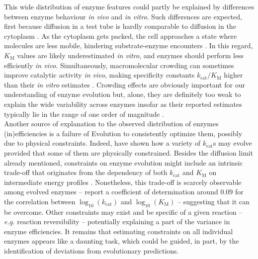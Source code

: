 \documentclass[11pt,onecolumn]{article}
\begin{document}
This wide distribution of enzyme features could partly be explained by differences between enzyme behaviour \textit{in vivo} and \textit{in vitro}. Such differences are expected, first because diffusion in a test tube is hardly comparable to diffusion in the cytoplasm \citep{Ellis01,Rivas04,Zhou08,Rivas18}. As the cytoplasm gets packed, the cell approaches a state where molecules are less mobile, hindering substrate-enzyme encounters \citep{Muramatsu88,Zimmerman93,Blanco18}. In this regard, $K_\text{M}$ values are likely underestimated \textit{in vitro}, and enzymes should perform less efficiently \textit{in vivo}. Simultaneously, macromolecular crowding can sometimes improve catalytic activity \textit{in vivo}, making specificity constants $k_\text{cat}/K_\text{M}$ higher than their \textit{in vitro} estimates \citep{Ralston90,Ellis01,Jiang07,Pozdnyakova10}. Crowding effects are obviously important for our understanding of enzyme evolution but, alone, they are definitely too weak to explain the wide variability across enzymes insofar as their reported estimates typically lie in the range of one order of magnitude \citep{Davidi16}. \\

Another source of explanation to the observed distribution of enzymes (in)efficiencies is a failure of Evolution to consistently optimize them, possibly due to physical constraints. Indeed, \citet{Heckmann18} have shown how a variety of $k_\text{cat}$s may evolve provided that some of them are physically constrained. Besides the diffusion limit already mentioned, constraints on enzyme evolution might include an intrinsic trade-off \citep{Gudelj10,Stiffler15} that originates from the dependency of both $k_\text{cat}$ and $K_\text{M}$ on intermediate energy profiles \citep{Heinrich91}. Nonetheless, this trade-off is scarcely observable among evolved enzymes -- \citet{Bar-Even11} report a coefficient of determination around $0.09$ for the correlation between $\log_{10}(k_\text{cat})$ and $\log_{10}(K_\text{M})$ -- suggesting that it can be overcome. 
Other constraints may exist and be specific of a given reaction \citep{Klipp94} -- \textit{e.g.} reaction reversibility -- potentially explaining a part of the variance in enzyme efficiencies.
It remains that estimating constraints on all individual enzymes appears like a daunting task, which could be guided, in part, by the identification of deviations from evolutionary predictions.\\
\end{document}
